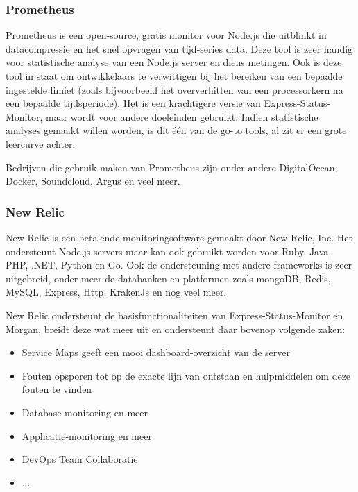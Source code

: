 \subsubsection{Prometheus}
\label{sec:prometheus}

Prometheus is een open-source, gratis monitor voor Node.js die uitblinkt in datacompressie en het snel opvragen van tijd-series data. Deze tool is zeer handig voor statistische analyse van een Node.js server en diens metingen. Ook is deze tool in staat om ontwikkelaars te verwittigen bij het bereiken van een bepaalde ingestelde limiet (zoals bijvoorbeeld het oververhitten van een processorkern na een bepaalde tijdsperiode). Het is een krachtigere versie van Express-Status-Monitor, maar wordt voor andere doeleinden gebruikt. Indien statistische analyses gemaakt willen worden, is dit één van de go-to tools, al zit er een grote leercurve achter.

Bedrijven die gebruik maken van Prometheus zijn onder andere DigitalOcean, Docker, Soundcloud, Argus en veel meer.

\subsubsection{New Relic}
\label{sec:newRelic}

New Relic is een betalende monitoringsoftware gemaakt door New Relic, Inc. Het ondersteunt Node.js servers maar kan ook gebruikt worden voor Ruby, Java, PHP, .NET, Python en Go. Ook de ondersteuning met andere frameworks is zeer uitgebreid, onder meer de databanken en platformen zoals mongoDB, Redis, MySQL, Express, Http, KrakenJs en nog veel meer.  

New Relic ondersteunt de basisfunctionaliteiten van Express-Status-Monitor en Morgan, breidt deze wat meer uit en ondersteunt daar bovenop volgende zaken:

\begin{itemize}
	\item Service Maps geeft een mooi dashboard-overzicht van de server
	\item Fouten opsporen tot op de exacte lijn van ontstaan en hulpmiddelen om deze fouten te vinden
	\item Database-monitoring en meer
	\item Applicatie-monitoring en meer
	\item DevOps Team Collaboratie
	\item ...
\end{itemize}

